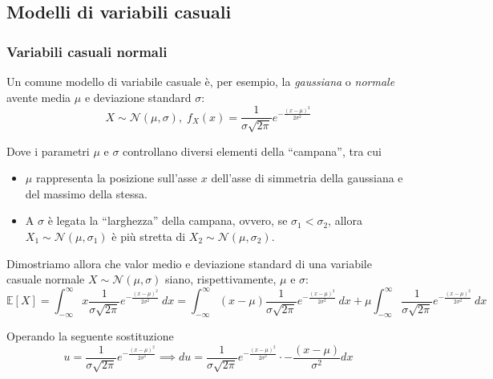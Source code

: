 \documentclass{article}
\begin{document}
        \vspace{10pt}
        \subsection{Modelli di variabili casuali}
            \subsubsection{Variabili casuali normali}
                Un comune modello di variabile casuale è, per esempio, la \textit{gaussiana} o \textit{normale} avente media $\mu$ e deviazione standard $\sigma$:
                \[
                    X \sim \mathcal{N}(\mu, \sigma), 
                    \; f_{X}(x) = \frac{1}{\sigma \sqrt{2 \pi}} e^{-\frac{(x - \mu)^{2}}{2 \sigma^{2}}}
                \]

                Dove i parametri $\mu$ e $\sigma$ controllano diversi elementi della ``campana'', tra cui
                \begin{itemize}
                    \item $\mu$ rappresenta la posizione sull'asse $x$ dell'asse di simmetria della gaussiana e del massimo della stessa.
                    \item A $\sigma$ è legata la ``larghezza'' della campana, ovvero, se $\sigma_{1} < \sigma_{2}$, allora $X_{1} \sim \mathcal{N}(\mu, \sigma_{1})$ è più stretta di $X_{2} \sim \mathcal{N}(\mu, \sigma_{2})$.
                \end{itemize}

                Dimostriamo allora che valor medio e deviazione standard di una variabile casuale normale $X \sim \mathcal{N}(\mu, \sigma)$ siano, rispettivamente, $\mu$ e $\sigma$:
                \[
                    \mathbb{E}[X] = \int_{-\infty}^{\infty} x \frac{1}{\sigma \sqrt{2 \pi}} e^{- \frac{(x - \mu)^{2}}{2 \sigma^{2}}} \: dx = 
                    \int_{-\infty}^{\infty} (x - \mu) \frac{1}{\sigma \sqrt{2 \pi}} e^{- \frac{(x - \mu)^{2}}{2 \sigma^{2}}} \: dx + \mu \int_{-\infty}^{\infty} \frac{1}{\sigma \sqrt{2 \pi}} e^{-\frac{(x - \mu)^{2}}{2 \sigma^{2}}} \: dx
                \]

                Operando la seguente sostituzione
                \[
                    u = \frac{1}{\sigma \sqrt{2 \pi}} e^{-\frac{(x - \mu)^{2}}{2 \sigma^{2}}} \implies du = \frac{1}{\sigma \sqrt{2 \pi}} e^{-\frac{(x - \mu)^{2}}{2 \sigma^{2}}} \cdot - \frac{(x - \mu)}{\sigma^{2}} dx
                \]
\end{document}
